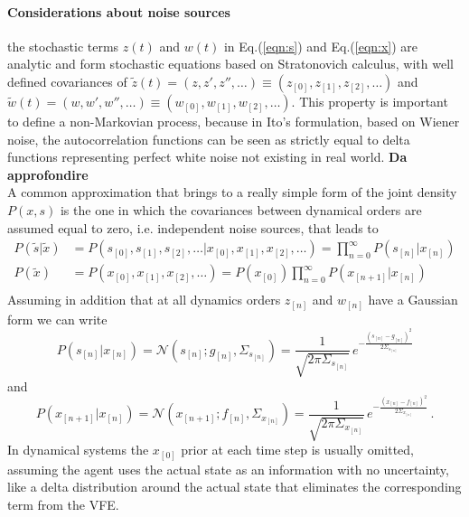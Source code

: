 \documentclass[a4paper, 10pt]{article}
\begin{document}
\paragraph{Considerations about noise sources}
the stochastic terms $z(t)$ and $w(t)$ in Eq.(\ref{eqn:s}) and Eq.(\ref{eqn:x}) are analytic and form stochastic equations based on Stratonovich calculus, with well defined covariances of $\tilde{z}(t) = (z,z',z'',\dots) \equiv (z_{[0]}, z_{[1]}, z_{[2]}, \dots)$ and $\tilde{w}(t) = (w,w',w'',\dots) \equiv (w_{[0]}, w_{[1]}, w_{[2]}, \dots)$. This property is important to define a non-Markovian process, because in Ito's formulation, based on Wiener noise, the autocorrelation functions can be seen as strictly equal to delta functions representing perfect white noise not existing in real world. \textbf{Da approfondire}\\
A common approximation that brings to a really simple form of the joint density $P(x,s)$ is the one in which the covariances between dynamical orders are assumed equal to zero, i.e. independent noise sources, that leads to 
\begin{equation}
\begin{split}
P(\tilde{s} | \tilde{x}) & = P(s_{[0]}, s_{[1]}, s_{[2]}, \dots | x_{[0]}, x_{[1]}, x_{[2]}, \dots) = \prod_{n=0}^{\infty} P(s_{[n]} | x_{[n]}) \\
P(\tilde{x}) & = P(x_{[0]}, x_{[1]}, x_{[2]}, \dots) = P(x_{[0]}) \prod_{n=0}^{\infty} P(x_{[n+1]} | x_{[n]}) \\
\end{split}
\end{equation}
Assuming in addition that at all dynamics orders $z_{[n]}$ and $w_{[n]}$ have a Gaussian form we can write
\begin{equation}
P(s_{[n]} | x_{[n]}) = \mathcal{N}(s_{[n]};g_{[n]},\Sigma_{s_{[n]}})
	=\frac{1}{\sqrt{2\pi \Sigma_{s_{[n]}}}} \, e^{-\frac{(s_{[n]}-g_{[n]})^2}{2 \Sigma_{s_{[n]}}}}
\end{equation}
and
\begin{equation}
P(x_{[n+1]} | x_{[n]}) = \mathcal{N}(x_{[n+1]};f_{[n]},\Sigma_{x_{[n]}})
	=\frac{1}{\sqrt{2\pi \Sigma_{x_{[n]}}}} \, e^{-\frac{(x_{[n]}-f_{[n]})^2}{2 \Sigma_{x_{[n]}}}} \, .
\end{equation}
In dynamical systems the $x_{[0]}$ prior at each time step is usually omitted, assuming the agent uses the actual state as an information with no uncertainty, like a delta distribution around the actual state that eliminates the corresponding term from the VFE.
\end{document}
